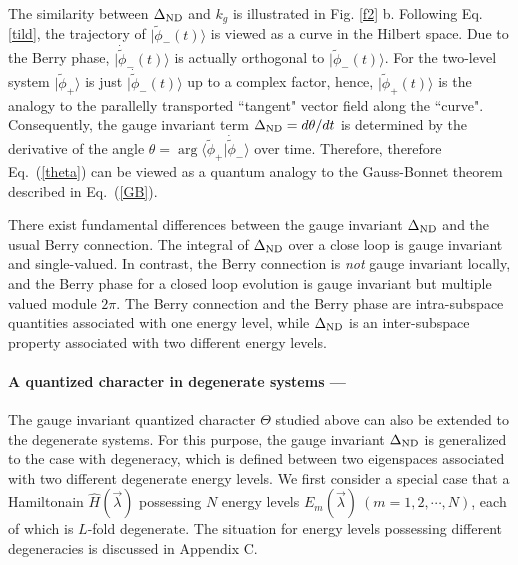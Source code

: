 \documentclass[aps,pra,twocolumn,groupedaddress,10pt]{revtex4}
\begin{document}
The similarity between $\Delta_{{\rm{ND}}}$ and $k_g$ is illustrated
in Fig. \ref{f2} b.
Following Eq. \ref{tild}, the trajectory of $|\tilde{\phi}_-(t)\rangle$
is viewed as a curve in the Hilbert space.
Due to the Berry phase, $|\dot{\tilde{\phi}}_-(t)\rangle$ is actually orthogonal to $|\tilde{\phi}_-(t)\rangle$.
For the two-level system $|\tilde{\phi}_+\rangle$ is just $|\dot{\tilde{\phi}}_-(t)\rangle$ up to a complex factor,
hence, $|\tilde{\phi}_+(t)\rangle$ is the analogy to the parallelly
transported ``tangent" vector field along the ``curve".
Consequently, the gauge invariant term $\Delta_{\rm{ND}} = d\theta/dt$ is
determined by the derivative of the angle
$\theta = \arg\langle \tilde{\phi}_+|\dot{\tilde{\phi}}_-\rangle$
over time.
Therefore, therefore Eq.~(\ref{theta}) can be viewed as a quantum analogy
to the Gauss-Bonnet theorem described in Eq.~(\ref{GB}).

There exist fundamental differences between the gauge invariant $\Delta_{\rm{ND}}$ and the usual Berry connection.
The integral of  $\Delta_{\rm{ND}}$ over a close loop is
gauge invariant and single-valued.
In contrast, the Berry connection is {\it not} gauge invariant locally,
and the Berry phase for a closed loop evolution is gauge invariant
but multiple valued module $2\pi$.
The Berry connection and the Berry phase are intra-subspace quantities associated with one energy level, while
$\Delta_{\rm{ND}}$ is an inter-subspace property associated with
two different energy levels.


\paragraph*{A quantized character in degenerate systems ---}
The gauge invariant quantized character $\Theta$ studied above
can also be extended to the degenerate systems.
For this purpose, the gauge invariant $\Delta_{\rm{ND}}$ is generalized
to the case with degeneracy, which is defined between
two eigenspaces associated
with two different degenerate energy levels.
We first consider a special case that a Hamiltonain $\hat{H}(\vec{\lambda})$
possessing $N$ energy levels $E_m(\vec{\lambda})~(m=1,2,\cdots, N)$,
each of which is $L$-fold degenerate.
The situation for energy levels possessing different degeneracies
is discussed in Appendix C.
\end{document}
